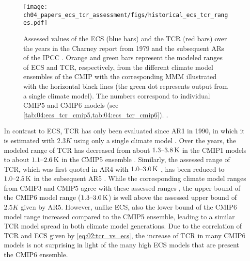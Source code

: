 \begin{figure}[t]
  \centering
  \texttt{[image: 
    ch04\_papers\_ecs\_tcr\_assessment/figs/historical\_ecs\_tcr\_ranges.pdf]}
  \caption{Assessed values of the \acf{ECS} (blue bars) and the \acf{TCR} (red
    bars) over the years in the Charney report from 1979 \autocite{Charney1979}
    and the subsequent \acfp{AR} of the \acf{IPCC} \autocite{Mitchell1990,
      Kattenberg1996, Albritton2001, Solomon2007, Stocker2013}. Orange and
    green bars represent the modeled ranges of \acs{ECS} and \acs{TCR},
    respectively, from the different climate model ensembles of the \acf{CMIP}
    with the corresponding \acf{MMM} illustrated with the horizontal black
    lines (the green dot represents output from a single climate model). The
    numbers correspond to individual \acs{CMIP}5 and \acs{CMIP}6 models (see
    \cref{tab:04:ecs_tcr_cmip5,tab:04:ecs_tcr_cmip6}).
    .}
  \label{fig:04:historical_ecs_tcr_ranges}
\end{figure}

In contrast to \ac{ECS}, \ac{TCR} has only been evaluated since \acs{AR}1 in
1990, in which it is estimated with $2.3 \unit{K}$ using only a single climate
model . Over the years, the modeled range
of \ac{TCR} has decreased from about $\range{1.3}{3.8} \unit{K}$ in the
\acs{CMIP}1 models \autocite{Kattenberg1996} to about $\range{1.1}{2.6}
\unit{K}$ in the \acs{CMIP}5 ensemble \autocite{Flato2013}. Similarly, the
assessed range of \ac{TCR}, which was first quoted in \acs{AR}4 with
$\range{1.0}{3.0} \unit{K}$ \autocite{Solomon2007}, has been reduced to
$\range{1.0}{2.5} \unit{K}$ in the subsequent \acs{AR}5 \autocite{Stocker2013}.
While the corresponding climate model ranges from \acs{CMIP}3 and \acs{CMIP}5
agree with these assessed ranges \autocite{Randall2007, Flato2013}, the upper
bound of the \acs{CMIP}6 model range ($\range{1.3}{3.0} \unit{K}$) is well
above the assessed upper bound of $2.5 \unit{K}$ given by \acs{AR}5. However,
unlike \ac{ECS}, also the lower bound of the \acs{CMIP}6 model range increased
compared to the \acs{CMIP}5 ensemble, leading to a similar \ac{TCR} model
spread in both climate model generations. Due to the correlation of \ac{TCR}
and \ac{ECS} given by \cref{eq:02:tcr_vs_ecs}, the increase of \ac{TCR} in many
\acs{CMIP}6 models is not surprising in light of the many high \ac{ECS} models
that are present the \acs{CMIP}6 ensemble.


